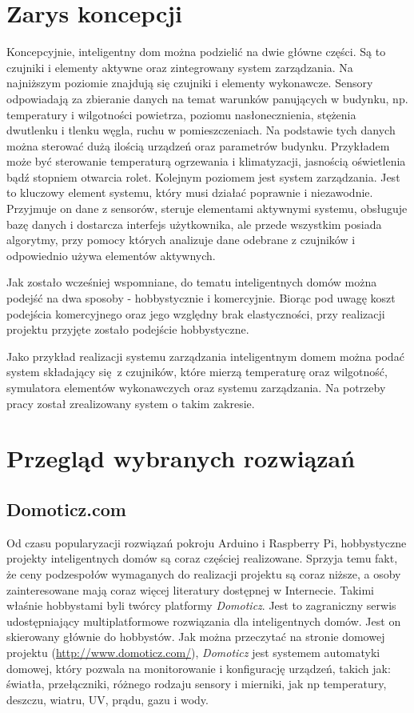 \documentclass[eng,oneside]{mgr}
\begin{document}
\section{Zarys koncepcji}
Koncepcyjnie, inteligentny dom można podzielić na dwie główne części. Są to czujniki i elementy aktywne oraz zintegrowany system zarządzania. Na najniższym poziomie znajdują się czujniki i elementy wykonawcze. Sensory odpowiadają za zbieranie danych na temat warunków panujących w budynku, np. temperatury i wilgotności powietrza, poziomu nasłonecznienia, stężenia dwutlenku i tlenku węgla, ruchu w pomieszczeniach. Na podstawie tych danych można sterować dużą ilością urządzeń oraz parametrów budynku. Przykładem może być sterowanie temperaturą ogrzewania i klimatyzacji, jasnością oświetlenia bądź stopniem otwarcia rolet. Kolejnym poziomem jest system zarządzania. Jest to kluczowy element systemu, który musi działać poprawnie i niezawodnie. Przyjmuje on dane z sensorów, steruje elementami aktywnymi systemu, obsługuje bazę danych i dostarcza interfejs użytkownika, ale przede wszystkim posiada algorytmy, przy pomocy których analizuje dane odebrane z czujników i odpowiednio używa elementów aktywnych.

Jak zostało wcześniej wspomniane, do tematu inteligentnych domów można podejść na dwa sposoby - hobbystycznie i komercyjnie. Biorąc pod uwagę koszt podejścia komercyjnego oraz jego względny brak elastyczności, przy realizacji projektu przyjęte zostało podejście hobbystyczne.

Jako przykład realizacji systemu zarządzania inteligentnym domem można podać system składający się z czujników, które mierzą temperaturę oraz wilgotność, symulatora elementów wykonawczych oraz systemu zarządzania. Na potrzeby pracy został zrealizowany system o takim zakresie.

\section{Przegląd wybranych rozwiązań}
\subsection{Domoticz.com}
Od czasu popularyzacji rozwiązań pokroju Arduino i Raspberry Pi, hobbystyczne projekty inteligentnych domów są coraz częściej realizowane. Sprzyja temu fakt, że ceny podzespołów wymaganych do realizacji projektu są coraz niższe, a osoby zainteresowane mają coraz więcej literatury dostępnej w Internecie. Takimi właśnie hobbystami byli twórcy platformy \textit{Domoticz}. Jest to zagraniczny serwis udostępniający multiplatformowe rozwiązania dla inteligentnych domów. Jest on skierowany głównie do hobbystów. Jak można przeczytać na stronie domowej projektu (\url{http://www.domoticz.com/}), \textit{Domoticz} jest systemem automatyki domowej, który pozwala na monitorowanie i konfigurację urządzeń, takich jak: światła, przełączniki, różnego rodzaju sensory i mierniki, jak np temperatury, deszczu, wiatru, UV, prądu, gazu i wody.
\end{document}
